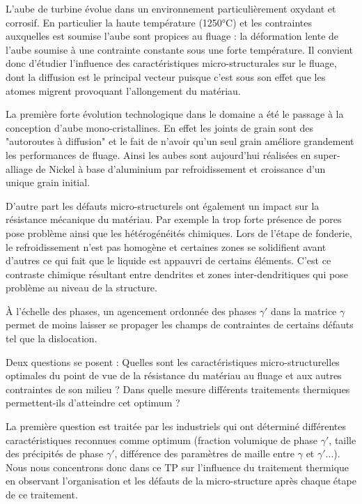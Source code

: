 L'aube de turbine évolue dans un environnement particulièrement oxydant et corrosif. En particulier la haute température (1250°C) et les contraintes auxquelles est soumise l'aube sont propices au fluage : la déformation lente de l'aube soumise à une contrainte constante sous une forte température. Il convient donc d'étudier l'influence des caractéristiques micro-structurales sur le fluage, dont la diffusion est le principal vecteur puisque c'est sous son effet que les atomes migrent provoquant l'allongement du matériau.

La première forte évolution technologique dans le domaine a été le passage à la conception d'aube mono-cristallines. En effet les joints de grain sont des "autoroutes à diffusion" et le fait de n'avoir qu'un seul grain améliore grandement les performances de fluage. Ainsi les aubes sont aujourd'hui réalisées en super-alliage de Nickel à base d'aluminium par refroidissement et croissance d'un unique grain initial.

D'autre part les défauts micro-structurels ont également un impact sur la résistance mécanique du matériau. Par exemple la trop forte présence de pores pose problème ainsi que les hétérogénéités chimiques. Lors de l'étape de fonderie, le refroidissement n'est pas homogène et certaines zones se solidifient avant d'autres ce qui fait que le liquide est appauvri de certains éléments. C'est ce contraste chimique résultant entre dendrites et zones inter-dendritiques qui pose problème au niveau de la structure.

À l'échelle des phases, un agencement ordonnée des phases $\gamma'$ dans la matrice $\gamma$ permet de moins laisser se propager les champs de contraintes de certains défauts tel que la dislocation.

Deux questions se posent : Quelles sont les caractéristiques micro-structurelles optimales du point de vue de la résistance du matériau au fluage et aux autres contraintes de son milieu ? Dans quelle mesure différents traitements thermiques permettent-ils d'atteindre cet optimum ?

La première question est traitée par les industriels qui ont déterminé différentes caractéristiques reconnues comme optimum (fraction volumique de phase $\gamma'$, taille des précipités de phase $\gamma'$, différence des paramètres de maille entre $\gamma$ et $\gamma'$...).
Nous nous concentrons donc dans ce TP sur l'influence du traitement thermique en observant l'organisation et les défauts de la micro-structure après chaque étape de ce traitement.

\newpage